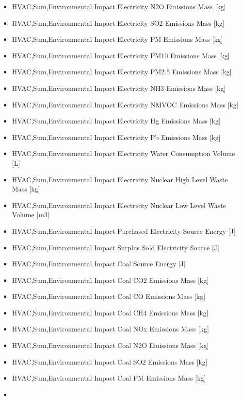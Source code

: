 \begin{itemize}
\item
  HVAC,Sum,Environmental Impact Electricity N2O Emissions Mass {[}kg{]}
\item
  HVAC,Sum,Environmental Impact Electricity SO2 Emissions Mass {[}kg{]}
\item
  HVAC,Sum,Environmental Impact Electricity PM Emissions Mass {[}kg{]}
\item
  HVAC,Sum,Environmental Impact Electricity PM10 Emissions Mass {[}kg{]}
\item
  HVAC,Sum,Environmental Impact Electricity PM2.5 Emissions Mass {[}kg{]}
\item
  HVAC,Sum,Environmental Impact Electricity NH3 Emissions Mass {[}kg{]}
\item
  HVAC,Sum,Environmental Impact Electricity NMVOC Emissions Mass {[}kg{]}
\item
  HVAC,Sum,Environmental Impact Electricity Hg Emissions Mass {[}kg{]}
\item
  HVAC,Sum,Environmental Impact Electricity Pb Emissions Mass {[}kg{]}
\item
  HVAC,Sum,Environmental Impact Electricity Water Consumption Volume {[}L{]}
\item
  HVAC,Sum,Environmental Impact Electricity Nuclear High Level Waste Mass {[}kg{]}
\item
  HVAC,Sum,Environmental Impact Electricity Nuclear Low Level Waste Volume {[}m3{]}
\item
  HVAC,Sum,Environmental Impact Purchased Electricity Source Energy {[}J{]}
\item
  HVAC,Sum,Environmental Impact Surplus Sold Electricity Source {[}J{]}
\item
  HVAC,Sum,Environmental Impact Coal Source Energy {[}J{]}
\item
  HVAC,Sum,Environmental Impact Coal CO2 Emissions Mass {[}kg{]}
\item
  HVAC,Sum,Environmental Impact Coal CO Emissions Mass {[}kg{]}
\item
  HVAC,Sum,Environmental Impact Coal CH4 Emissions Mass {[}kg{]}
\item
  HVAC,Sum,Environmental Impact Coal NOx Emissions Mass {[}kg{]}
\item
  HVAC,Sum,Environmental Impact Coal N2O Emissions Mass {[}kg{]}
\item
  HVAC,Sum,Environmental Impact Coal SO2 Emissions Mass {[}kg{]}
\item
  HVAC,Sum,Environmental Impact Coal PM Emissions Mass {[}kg{]}
\item

\end{itemize}
